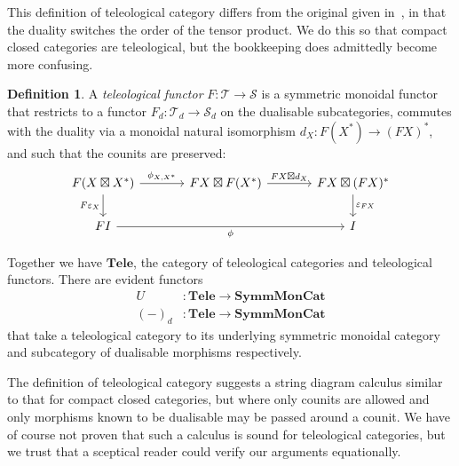 \documentclass[11pt,letterpaper]{article}
\theoremstyle{plain}
\theoremstyle{definition}
\newtheorem{definition}[theorem]{Definition}
\newtheorem{example}[theorem]{Example}
\newcommand{\T}{\mathscr{T}}
\renewcommand{\S}{\mathscr{S}}
\newcommand{\SymmMonCat}{\mathbf{SymmMonCat}}
\newcommand{\Tele}{\mathbf{Tele}}
\newcommand{\teletimes}{\mathbin{\boxtimes}}
\newcommand{\todo}[1]{\textcolor{red}{\small #1}}
\begin{document}
This definition of teleological category differs from the original given in~\cite{CoherenceForLenses}, in that the duality switches the order of the tensor product. We do this so that compact closed categories are teleological, but the bookkeeping does admittedly become more confusing.


\begin{definition}
  A \emph{teleological functor} $F : \T \to \S$ is a symmetric monoidal functor that restricts to a functor $F_d : \T_d \to \S_d$ on the dualisable subcategories, commutes with the duality via a monoidal natural isomorphism $d_X : F(X^*) \to {(FX)}^*$, and such that the counits are preserved:
  \[
   \begin{tikzcd}[column sep = large]
    F(X \teletimes X^*) \ar[r, "\phi_{X, X^*}"]  \ar[d, "F\varepsilon_X", swap] & FX \teletimes F(X^*) \ar[r, "FX \teletimes d_X"] & FX \teletimes (FX)^* \ar[d, "\varepsilon_{FX}"] \\
    FI \ar[rr, "\phi", swap] & & I
  \end{tikzcd}
  \]
\end{definition}

Together we have $\Tele$, the category of teleological categories and teleological functors. There are evident functors 
\begin{align*}
U &: \Tele \to \SymmMonCat \\
{(-)}_d &: \Tele \to \SymmMonCat 
\end{align*}
that take a teleological category to its underlying symmetric monoidal category and subcategory of dualisable morphisms respectively.

The definition of teleological category suggests a string diagram calculus similar to that for compact closed categories, but where only counits are allowed and only morphisms known to be dualisable may be passed around a counit. We have of course not proven that such a calculus is sound for teleological categories, but we trust that a sceptical reader could verify our arguments equationally.
\end{document}
